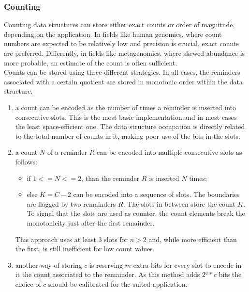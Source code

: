 \subsubsection{Counting}
\label{sec:rsqfcount}
Counting data structures can store either exact counts or order of magnitude, depending on the application. In fields like human genomics, where count numbers are expected to be relatively low and precision is crucial, exact counts are preferred. Differently, in fields like metagenomics, where skewed abundance is more probable, an estimate of the count is often sufficient.\\
Counts can be stored using three different strategies. In all cases, the reminders associated with a certain quotient are stored in monotonic order within the data structure.
\begin{enumerate}
	\item  a count can be encoded as the number of times a reminder is inserted into consecutive slots. This is the most basic implementation and in most cases the least space-efficient one. The data structure occupation is directly related to the total number of counts in it, making poor use of the bits in the slots.
	\item a count $N$ of a reminder $R$ can be encoded into multiple consecutive slots as follows: 
	\begin{itemize}
		\item if $1 <= N <= 2$, than the reminder $R$ is inserted $N$ times;
		\item else $K = C - 2$ can be encoded into a sequence of slots. The boundaries are flagged by two remainders $R$. The slots in between store the count $K$. To signal that the slots are used as counter, the count elements break the monotonicity just after the first remainder.
	\end{itemize}
	This approach uses at least 3 slots for $n>2$ and, while more efficient than the first, is still inefficient for low count values.
	\item another way of storing $c$ is reserving $m$ extra bits for every slot to encode in it the count associated to the remainder. As this method adds $2^q * c$ bits the choice of $c$ should be calibrated for the suited application. 
\end{enumerate}

